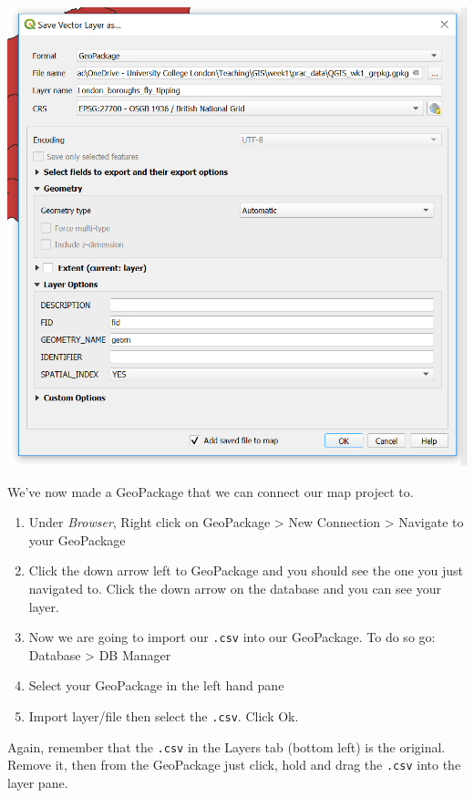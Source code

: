 \documentclass[]{book}
\providecommand{\tightlist}{%
  \setlength{\itemsep}{0pt}\setlength{\parskip}{0pt}}
\begin{document}
\begin{center}\includegraphics[width=500pt]{prac1_images/make_geopkg} \end{center}

We've now made a GeoPackage that we can connect our map project to.

\begin{enumerate}
\def\labelenumi{\arabic{enumi}.}
\setcounter{enumi}{14}
\tightlist
\item
  Under \emph{Browser}, Right click on GeoPackage \textgreater{} New Connection \textgreater{} Navigate to your GeoPackage
\item
  Click the down arrow left to GeoPackage and you should see the one you just navigated to. Click the down arrow on the database and you can see your layer.
\item
  Now we are going to import our \texttt{.csv} into our GeoPackage. To do so go: Database \textgreater{} DB Manager
\item
  Select your GeoPackage in the left hand pane
\item
  Import layer/file then select the \texttt{.csv}. Click Ok.
\end{enumerate}

Again, remember that the \texttt{.csv} in the Layers tab (bottom left) is the original. Remove it, then from the GeoPackage just click, hold and drag the \texttt{.csv} into the layer pane.
\end{document}
